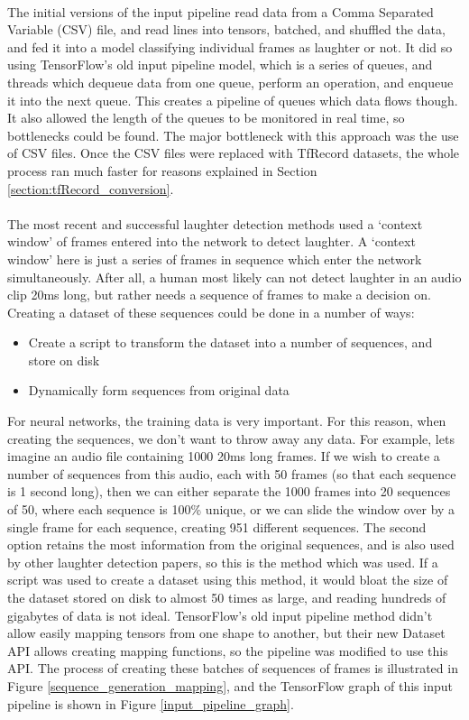 \documentclass[a4paper,11pt,notitlepage]{article}
\begin{document}
\\
The initial versions of the input pipeline read data from a Comma Separated Variable (CSV) file, and read lines into tensors, batched, and shuffled the data, and fed it into a model classifying individual frames as laughter or not. It did so using TensorFlow's old input pipeline model, which is a series of queues, and threads which dequeue data from one queue, perform an operation, and enqueue it into the next queue. This creates a pipeline of queues which data flows though. It also allowed the length of the queues to be monitored in real time, so bottlenecks could be found. The major bottleneck with this approach was the use of CSV files. Once the CSV files were replaced with TfRecord datasets, the whole process ran much faster for reasons explained in Section \ref{section:tfRecord_conversion}.\\
\\
The most recent and successful laughter detection methods used a `context window' of frames entered into the network to detect laughter. A `context window' here is just a series of frames in sequence which enter the network simultaneously. After all, a human most likely can not detect laughter in an audio clip 20ms long, but rather needs a sequence of frames to make a decision on. Creating a dataset of these sequences could be done in a number of ways:
\begin{itemize}
\item Create a script to transform the dataset into a number of sequences, and store on disk
\item Dynamically form sequences from original data
\end{itemize}
For neural networks, the training data is very important. For this reason, when creating the sequences, we don't want to throw away any data. For example, lets imagine an audio file containing 1000 20ms long frames. If we wish to create a number of sequences from this audio, each with 50 frames (so that each sequence is 1 second long), then we can either separate the 1000 frames into 20 sequences of 50, where each sequence is 100\% unique, or we can slide the window over by a single frame for each sequence, creating 951 different sequences. The second option retains the most information from the original sequences, and is also used by other laughter detection papers, so this is the method which was used. If a script was used to create a dataset using this method, it would bloat the size of the dataset stored on disk to almost 50 times as large, and reading hundreds of gigabytes of data is not ideal. TensorFlow's old input pipeline method didn't allow easily mapping tensors from one shape to another, but their new Dataset API allows creating mapping functions, so the pipeline was modified to use this API. The process of creating these batches of sequences of frames is illustrated in Figure \ref{sequence_generation_mapping}, and the TensorFlow graph of this input pipeline is shown in Figure \ref{input_pipeline_graph}.
\end{document}
